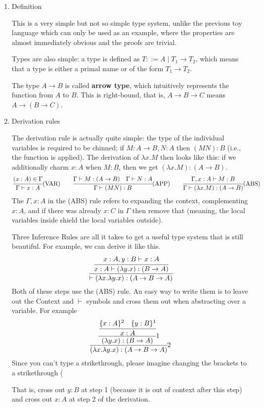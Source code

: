 \documentclass[a4paper]{exam}
\begin{document}
\begin{enumerate}
\item Definition

This is a very simple but not so simple type system, unlike the previous toy language which can only be used as an example, where the properties are almost immediately obvious and the proofs are trivial.

Types are also simple: a type is defined as $T::=A\mid T_1\to T_2$, which means that a type is either a primal name or of the form $T_1\to T_2$.

The type $A\to B$ is called \textbf{arrow type}, which intuitively represents the function from $A$ to $B$. This is right-bound, that is, $A\to B\to C$ means $A\to(B\to C)$.

\item Derivation rules

The derivation rule is actually quite simple: the type of the individual variables is required to be chinned; if $M:A\to B,N:A$ then $(MN):B$ (i.e., the function is applied). The derivation of $\lambda x.M$ then looks like this: if we additionally charm $x:A$ when $M:B$, then we get $(\lambda x. M):(A\to B)$.
$$
  \cfrac{(x:A)\in\Gamma}{\Gamma\vdash x:A}{\rm\tiny(VAR)}
  \qquad\cfrac{\Gamma\vdash M:(A\to B)\quad\Gamma\vdash N:A}{\Gamma\vdash (MN):B}{\rm\tiny(APP)}
  \qquad\cfrac{\Gamma,x:A\vdash M:B}{\Gamma\vdash (\lambda x.M):(A\to B)}{\rm\tiny(ABS)}
$$
The $\Gamma, x:A$ in the (ABS) rule refers to expanding the context, complementing $x:A$, and if there was already $x:C$ in $\Gamma$ then remove that (meaning, the local variables inside shield the local variables outside).

Three Inference Rules are all it takes to get a useful type system that is still beautiful. For example, we can derive it like this.
$$
  \cfrac{\cfrac{x:A,y:B\vdash x:A}{x:A\vdash(\lambda y.x):(B\to A)}}{\vdash (\lambda x.\lambda y.x):(A\to B\to A)}
$$
Both of these steps use the (ABS) rule. An easy way to write them is to leave out the Context and $\vdash$ symbols and cross them out when abstracting over a variable. For example
$$
  \cfrac{\cfrac{\cfrac{\{x:A\}^2\quad\{y:B\}^1}{x:A}}{(\lambda y.x):(B\to A)}\small1}{(\lambda x.\lambda y.x):(A\to B\to A)}\small2
$$
Since you can't type a strikethrough, please imagine changing the brackets to a strikethrough (

That is, cross out $y:B$ at step 1 (because it is out of context after this step) and cross out $x:A$ at step 2 of the derivation.


\end{enumerate}
\end{document}
